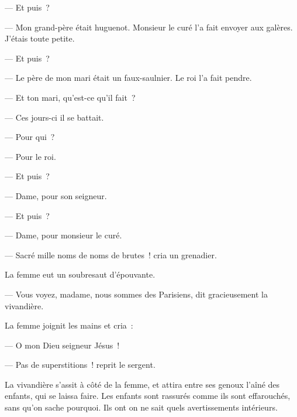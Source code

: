\documentclass[french,twoside]{book} %
\begin{document}
— Et puis ?\par
— Mon grand-père était huguenot. Monsieur le curé l’a fait envoyer aux galères. J’étais toute petite.\par
— Et puis ?\par
— Le père de mon mari était un faux-saulnier. Le roi l’a fait pendre.\par
— Et ton mari, qu’est-ce qu’il fait ?\par
— Ces jours-ci il se battait.\par
— Pour qui ?\par
— Pour le roi.\par
— Et puis ?\par
— Dame, pour son seigneur.\par
— Et puis ?\par
 — Dame, pour monsieur le curé.\par
— Sacré mille noms de noms de brutes ! cria un grenadier.\par
La femme eut un soubresaut d’épouvante.\par
— Vous voyez, madame, nous sommes des Parisiens, dit gracieusement la vivandière.\par
La femme joignit les mains et cria :\par
— O mon Dieu seigneur Jésus !\par
— Pas de superstitions ! reprit le sergent.\par
La vivandière s’assit à côté de la femme, et attira entre ses genoux l’aîné des enfants, qui se laissa faire. Les enfants sont rassurés comme ils sont effarouchés, sans qu’on sache pourquoi. Ils ont on ne sait quels avertissements intérieurs.\par
\end{document}
